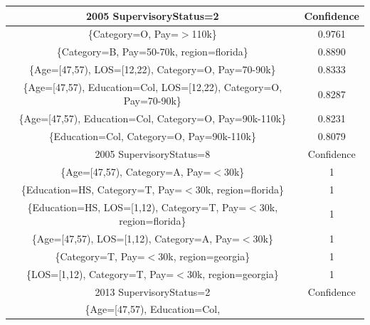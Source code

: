 \documentclass{article}
\begin{document}
    \begin{center}
        \begin{table}
            \centering
            \begin{tabular}{ |c|c| }
                \hline
                2005 SupervisoryStatus=2 & Confidence \\
                \hline
                \{Category=O,
                Pay=$>$110k\} & 0.9761 \\
                \{Category=B,
                Pay=50-70k,
                region=florida\} & 0.8890 \\
                \{Age=[47,57),
                LOS=[12,22),
                Category=O,
                Pay=70-90k\} & 0.8333 \\
                \{Age=[47,57),
                Education=Col,
                LOS=[12,22),
                Category=O,
                Pay=70-90k\} & 0.8287 \\
                \{Age=[47,57),
                Education=Col,
                Category=O,
                Pay=90k-110k\} & 0.8231 \\
                \{Education=Col,
                Category=O,
                Pay=90k-110k\} & 0.8079 \\
                \hline
                2005 SupervisoryStatus=8 & Confidence \\
                \hline
                \{Age=[47,57),
                Category=A,
                Pay=$<$30k\} & 1 \\
                \{Education=HS,
                Category=T,
                Pay=$<$30k,
                region=florida\} & 1 \\
                \{Education=HS,
                LOS=[1,12),
                Category=T,
                Pay=$<$30k,
                region=florida\} & 1 \\
                \{Age=[47,57),
                LOS=[1,12),
                Category=A,
                Pay=$<$30k\} & 1 \\
                \{Category=T,
                Pay=$<$30k,
                region=georgia\} & 1 \\
                \{LOS=[1,12),
                Category=T,
                Pay=$<$30k,
                region=georgia\} & 1 \\
                \hline
                2013 SupervisoryStatus=2 & Confidence \\
                \hline
                \{Age=[47,57),
                Education=Col,

\end{tabular}
\end{table}
\end{center}
\end{document}
